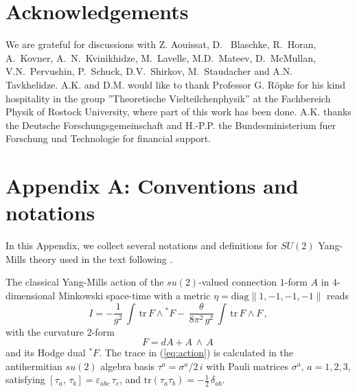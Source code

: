 \documentclass[a4paper,12pt]{article}
\begin{document}

\section*{Acknowledgements}



We are grateful for discussions with Z. Aouissat, D. ~Blaschke,  R.~Horan,
A.~Kovner, A.~N.~Kvinikhidze,  M.~Lavelle, M.D.~Mateev, D.~McMullan,
V.N.~Pervushin, P.~Schuck, D.V.~Shirkov, M.~Staudacher and  A.N.~ Tavkhelidze.
A.K. and D.M. would like to thank Professor G. R\"opke
for his kind hospitality in the group ''Theoretische Vielteilchenphysik''
at the Fachbereich Physik of Rostock University, where part of this work has
been done. A.K. thanks the Deutsche Forschungsgemeinschaft and
H.-P.P. the Bundesministerium fuer Forschung und Technologie for
financial support.


\section*{Appendix A: Conventions and notations}


\label{ap:A}

In this Appendix, we collect several notations and definitions for $SU(2)$
Yang-Mills theory used in the text following \cite{Jackiw}.

The classical Yang-Mills action of the $su(2)$-valued connection $1$-form $A$
in $4$-dimensional Minkowski space-time with a metric $\eta =
\mbox{diag}\|1,-1,-1,-1\|$
reads
\begin{equation}
\label{eq:action}
I  =  - \frac{1}{g^2} \, \int  \, \mbox{tr} \, F \wedge {}^\ast\! F -
\, \frac{\theta}{8\pi^2\,g^2} \, \int \, \mbox{tr} \, F \wedge F \,,
\end{equation}
with the curvature 2-form
\begin{equation}
F = d A + A \, \wedge\, A\,
\end{equation}
and its Hodge dual ${}^\ast\! F$.
The trace in (\ref{eq:action}) is calculated in the
antihermitian $su(2)$ algebra basis
$\tau^a = \sigma^a/2\, i $ with Pauli matrices $\sigma^a, \, a=1,2,3$,
satisfying $[\tau_a,\, \tau_b] = \varepsilon_{abc}\,\tau_c$, and
$\mbox{tr}\left(\tau_a\tau_b\right)= - \frac{1}{2}\, \delta_{ab}$.
\end{document}
